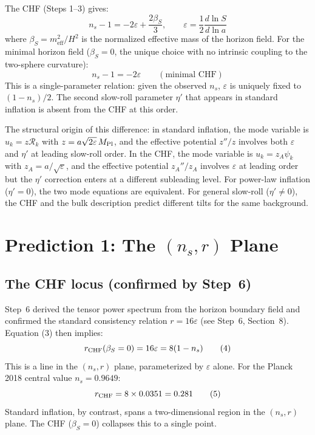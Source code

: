 \documentclass[12pt,a4paper]{article}
\begin{document}
The CHF (Steps 1--3) gives:
\begin{equation}
n_s - 1 = -2\varepsilon + \frac{2\beta_S}{3}, \qquad \varepsilon = \frac{1}{2}\frac{d\ln S}{d\ln a} \tag{2}
\end{equation}
where $\beta_S = m_\text{eff}^2/H^2$ is the normalized effective mass of the horizon field. For the minimal horizon field ($\beta_S = 0$, the unique choice with no intrinsic coupling to the two-sphere curvature):
\begin{equation}
n_s - 1 = -2\varepsilon \qquad (\text{minimal CHF}) \tag{3}
\end{equation}
This is a single-parameter relation: given the observed $n_s$, $\varepsilon$ is uniquely fixed to $(1-n_s)/2$. The second slow-roll parameter $\eta'$ that appears in standard inflation is absent from the CHF at this order.

The structural origin of this difference: in standard inflation, the mode variable is $u_k = z\mathcal{R}_k$ with $z = a\sqrt{2\varepsilon}\,M_{\rm Pl}$, and the effective potential $z''/z$ involves both $\varepsilon$ and $\eta'$ at leading slow-roll order. In the CHF, the mode variable is $u_k = z_A\psi_k$ with $z_A = a/\sqrt{\varepsilon}$, and the effective potential $z_A''/z_A$ involves $\varepsilon$ at leading order but the $\eta'$ correction enters at a different subleading level. For power-law inflation ($\eta' = 0$), the two mode equations are equivalent. For general slow-roll ($\eta' \neq 0$), the CHF and the bulk description predict different tilts for the same background.

\section{Prediction 1: The $(n_s, r)$ Plane}

\subsection{The CHF locus (confirmed by Step~6)}

Step~6 derived the tensor power spectrum from the horizon boundary field and confirmed the standard consistency relation $r = 16\varepsilon$ (see Step~6, Section~8). Equation (3) then implies:
\begin{equation}
r_{\rm CHF}(\beta_S = 0) = 16\varepsilon = 8(1 - n_s) \tag{4}
\end{equation}
This is a line in the $(n_s, r)$ plane, parameterized by $\varepsilon$ alone. For the Planck 2018 central value $n_s = 0.9649$:
\begin{equation}
r_{\rm CHF} = 8 \times 0.0351 = 0.281 \tag{5}
\end{equation}
Standard inflation, by contrast, spans a two-dimensional region in the $(n_s, r)$ plane. The CHF ($\beta_S=0$) collapses this to a single point.
\end{document}
